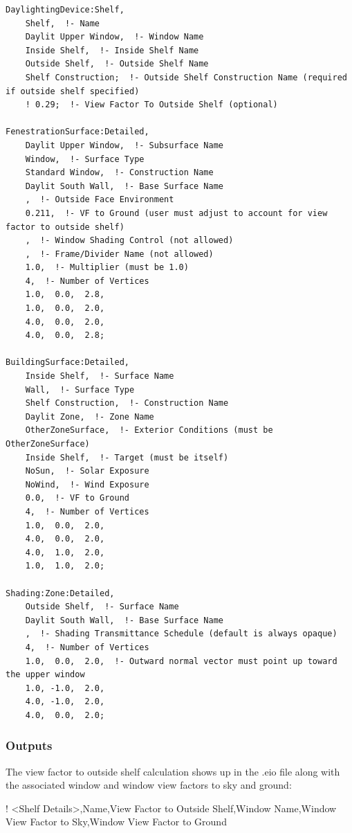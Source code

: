 \begin{lstlisting}
DaylightingDevice:Shelf,
    Shelf,  !- Name
    Daylit Upper Window,  !- Window Name
    Inside Shelf,  !- Inside Shelf Name
    Outside Shelf,  !- Outside Shelf Name
    Shelf Construction;  !- Outside Shelf Construction Name (required if outside shelf specified)
    ! 0.29;  !- View Factor To Outside Shelf (optional)

FenestrationSurface:Detailed,
    Daylit Upper Window,  !- Subsurface Name
    Window,  !- Surface Type
    Standard Window,  !- Construction Name
    Daylit South Wall,  !- Base Surface Name
    ,  !- Outside Face Environment
    0.211,  !- VF to Ground (user must adjust to account for view factor to outside shelf)
    ,  !- Window Shading Control (not allowed)
    ,  !- Frame/Divider Name (not allowed)
    1.0,  !- Multiplier (must be 1.0)
    4,  !- Number of Vertices
    1.0,  0.0,  2.8,
    1.0,  0.0,  2.0,
    4.0,  0.0,  2.0,
    4.0,  0.0,  2.8;

BuildingSurface:Detailed,
    Inside Shelf,  !- Surface Name
    Wall,  !- Surface Type
    Shelf Construction,  !- Construction Name
    Daylit Zone,  !- Zone Name
    OtherZoneSurface,  !- Exterior Conditions (must be OtherZoneSurface)
    Inside Shelf,  !- Target (must be itself)
    NoSun,  !- Solar Exposure
    NoWind,  !- Wind Exposure
    0.0,  !- VF to Ground
    4,  !- Number of Vertices
    1.0,  0.0,  2.0,
    4.0,  0.0,  2.0,
    4.0,  1.0,  2.0,
    1.0,  1.0,  2.0;

Shading:Zone:Detailed,
    Outside Shelf,  !- Surface Name
    Daylit South Wall,  !- Base Surface Name
    ,  !- Shading Transmittance Schedule (default is always opaque)
    4,  !- Number of Vertices
    1.0,  0.0,  2.0,  !- Outward normal vector must point up toward the upper window
    1.0, -1.0,  2.0,
    4.0, -1.0,  2.0,
    4.0,  0.0,  2.0;
\end{lstlisting}

\subsubsection{Outputs}\label{outputs-3-002}

The view factor to outside shelf calculation shows up in the .eio file along with the associated window and window view factors to sky and ground:

! \textless{}Shelf Details\textgreater{},Name,View Factor to Outside Shelf,Window Name,Window View Factor to Sky,Window View Factor to Ground

